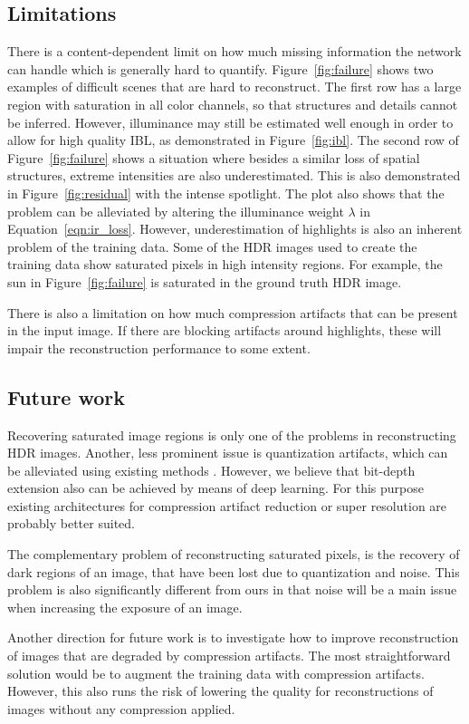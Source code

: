 \documentclass[acmtog]{acmart}
\newcommand{\figref}[1]{Figure~\ref{fig:#1}}
\newcommand{\eqnref}[1]{Equation~\ref{eqn:#1}}
\newcommand\customsection[1]{\subsection{#1}}
\begin{document}
\customsection{Limitations} There is a content-dependent limit on how much missing information the network can handle which is generally hard to quantify. \figref{failure} shows two examples of difficult scenes that are hard to reconstruct. The first row has a large region with saturation in all color channels, so that structures and details cannot be inferred. However, illuminance may still be estimated well enough in order to allow for high quality IBL, as demonstrated in \figref{ibl}. The second row of \figref{failure} shows a situation where besides a similar loss of spatial structures, extreme intensities are also underestimated. This is also demonstrated in \figref{residual} with the intense spotlight. The plot also shows that the problem can be alleviated by altering the illuminance weight $\lambda$ in \eqnref{ir_loss}. However, underestimation of highlights is also an inherent problem of the training data. 
Some of the HDR images used to create the training data show saturated pixels in high intensity regions. For example, the sun in \figref{failure} is saturated in the ground truth HDR image.

There is also a limitation on how much compression artifacts that can be present in the input image. If there are blocking artifacts around highlights, these will impair the reconstruction performance to some extent.

\customsection{Future work} Recovering saturated image regions is only one of the problems in reconstructing HDR images. Another, less prominent issue is quantization artifacts, which can be alleviated using existing methods \cite{Daly2003}. However, we believe that bit-depth extension also can be achieved by means of deep learning. For this purpose existing architectures for compression artifact reduction \cite{Svoboda2016} or super resolution \cite{Ledig2016} are probably better suited.

The complementary problem of reconstructing saturated pixels, is the recovery of dark regions of an image, that have been lost due to quantization and noise. This problem is also significantly different from ours in that noise will be a main issue when increasing the exposure of an image.

Another direction for future work is to investigate how to improve reconstruction of images that are degraded by compression artifacts. The most straightforward solution would be to augment the training data with compression artifacts. However, this also runs the risk of lowering the quality for reconstructions of images without any compression applied.
\end{document}
